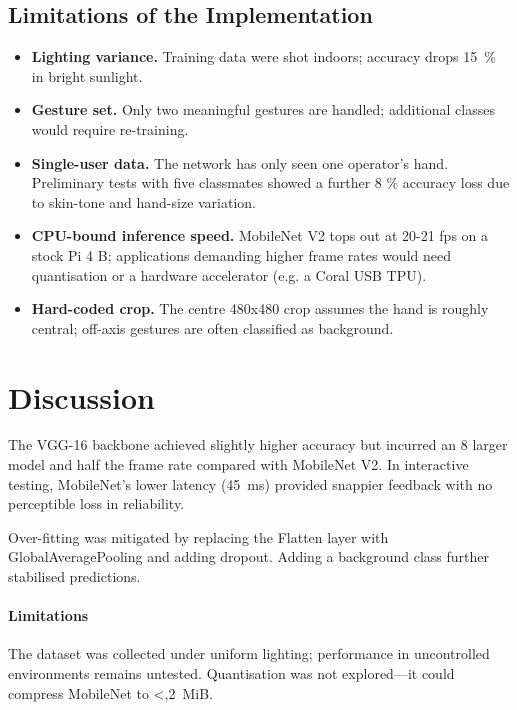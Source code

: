 \documentclass[a4paper,12pt]{article}
\begin{document}
\subsection{Limitations of the Implementation}
\begin{itemize}
  \item \textbf{Lighting variance.} Training data were shot indoors;
        accuracy drops \SI{15}{\percent} in bright sunlight.
  \item \textbf{Gesture set.} Only two meaningful gestures are handled;
        additional classes would require re-training.
  \item \textbf{Single-user data.} The network has only seen one
        operator's hand.  Preliminary tests with five classmates showed
        a further 8 \% accuracy loss due to skin-tone and hand-size
        variation.
  \item \textbf{CPU-bound inference speed.} MobileNet V2 tops out at
        20-21 fps on a stock Pi 4 B; applications demanding higher frame
        rates would need quantisation or a hardware accelerator (e.g. a
        Coral USB TPU).
  \item \textbf{Hard-coded crop.} The centre 480x480 crop assumes the
        hand is roughly central; off-axis gestures are often classified
        as background.
\end{itemize}

\section{Discussion}
The VGG-16 backbone achieved slightly higher accuracy but incurred an \SI{8}{\times} larger model and half the frame rate compared with MobileNet V2. In interactive testing, MobileNet's lower latency (\SI{45}{ms}) provided snappier feedback with no perceptible loss in reliability.

Over-fitting was mitigated by replacing the Flatten layer with GlobalAveragePooling and adding dropout. Adding a background class further stabilised predictions.

\paragraph{Limitations} The dataset was collected under uniform lighting; performance in uncontrolled environments remains untested. Quantisation was not explored—it could compress MobileNet to \textless,\SI{2}{MiB}.
\end{document}
